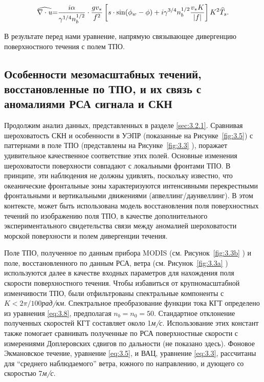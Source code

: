 \begin{equation} \label{eq:3.10} \widehat{\nabla \cdot {\it u}}{\rm =}\frac{i\alpha }{\gamma ^{1/4} n_{b}^{1/2} } \cdot \frac{gv_{*} }{f^{2} } \left[s\cdot \sin (\phi _{w} -\phi )+i\gamma ^{3/4} n_{b}^{1/2} \frac{v_{*} K}{\left|f\right|} \right]K^{2} \widehat{T}_{s} .  \end{equation} 



В результате перед нами уравнение, напрямую связывающее дивергенцию поверхностного течения с полем ТПО.



\subsection{Особенности мезомасштабных течений, восстановленные по ТПО, и их связь с аномалиями РСА сигнала и СКН} \label{sec:3.2.3}
 

Продолжим анализ данных, представленных в разделе \ref{sec:3.2.1}. Сравнивая шероховатость СКН и особенности в УЭПР (показанные на Рисунке~\ref{fig:3.5}) с паттернами в поле ТПО (представлены на Рисунке~\ref{fig:3.3} ), поражает удивительное качественное соответствие этих полей. Основные изменения шероховатости поверхности совпадают с локальными фронтами ТПО. В принципе, эти наблюдения не должны удивлять, поскольку известно, что океанические фронтальные зоны характеризуются интенсивными перекрестными фронтальными и вертикальными движениями (апвеллинг/даунвеллинг). В этом контексте, может быть использована модель восстановления поля поверхностных течений по изображению поля ТПО, в качестве дополнительного экспериментального свидетельства связи между аномалией шероховатости морской поверхности и полем дивергенции течения.

Поле ТПО, полученное по данным прибора MODIS (см. Рисунок~\ref{fig:3.3b} ) и поле, восстановленного по данным РСА, ветра (см. Рисунок~\ref{fig:3.3a} ) используются далее в качестве входных параметров для нахождения поля скорости поверхностного течения. Чтобы избавиться от крупномасштабной изменчивости ТПО, были отфильтрованы спектральные компоненты с $K<2\pi /100$\textit{рад/км}. Спектральное преобразование функции тока КГТ определено из уравнения \eqref{eq:3.8}, предполагая $n_{b} =n_{0} =50$. Стандартное отклонение полученных скоростей КГТ составляет около 1\textit{м/с}. Использование этих констант также помогает сравнивать полученные по РСА поверхностные скорости \citep{Chapron2005, Johannessen2008} с измерениями Доплеровских сдвигов по дальности (не показано здесь). Фоновое Экмановское течение, уравнение \eqref{eq:3.5}, и ВАЦ, уравнение \eqref{eq:3.3}, рассчитаны для ``среднего наблюдаемого'' ветра, южного по направлению, и дующего со скоростью 7\textit{м/с}.

